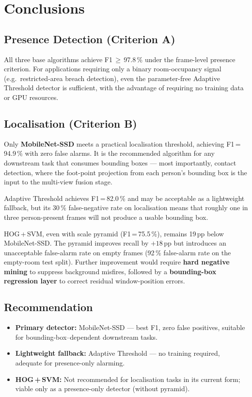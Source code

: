 \documentclass[11pt, a4paper]{article}
\begin{document}
\section{Conclusions}

\subsection{Presence Detection (Criterion A)}

All three base algorithms achieve F1\,$\geq$\,97.8\,\% under the frame-level presence
criterion.  For applications requiring only a binary room-occupancy signal (e.g.\
restricted-area breach detection), even the parameter-free Adaptive Threshold detector is
sufficient, with the advantage of requiring no training data or GPU resources.

\subsection{Localisation (Criterion B)}

Only \textbf{MobileNet-SSD} meets a practical localisation threshold, achieving
F1\,=\,94.9\,\% with zero false alarms.  It is the recommended algorithm for any
downstream task that consumes bounding boxes — most importantly, contact detection, where
the foot-point projection from each person's bounding box is the input to the multi-view
fusion stage.

Adaptive Threshold achieves F1\,=\,82.0\,\% and may be acceptable as a lightweight
fallback, but its 30\,\% false-negative rate on localisation means that roughly one in
three person-present frames will not produce a usable bounding box.

HOG\,+\,SVM, even with scale pyramid (F1\,=\,75.5\,\%), remains 19\,pp below
MobileNet-SSD.  The pyramid improves recall by $+18$\,pp but introduces an unacceptable
false-alarm rate on empty frames (92\,\% false-alarm rate on the empty-room test split).
Further improvement would require \textbf{hard negative mining} to suppress background
misfires, followed by a \textbf{bounding-box regression layer} to correct residual
window-position errors.

\subsection{Recommendation}

\begin{itemize}
    \item \textbf{Primary detector:} MobileNet-SSD — best F1, zero false positives,
          suitable for bounding-box–dependent downstream tasks.
    \item \textbf{Lightweight fallback:} Adaptive Threshold — no training required,
          adequate for presence-only alarming.
    \item \textbf{HOG\,+\,SVM:} Not recommended for localisation tasks in its current
          form; viable only as a presence-only detector (without pyramid).
\end{itemize}
\end{document}
